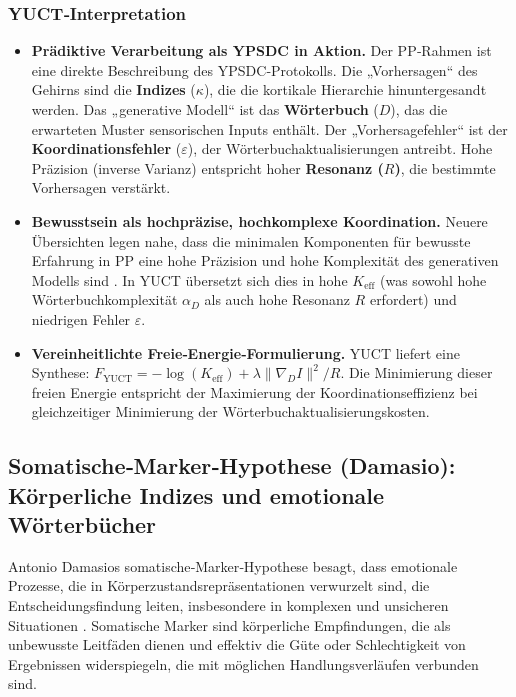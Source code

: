\documentclass[12pt,a4paper]{article}
\begin{document}
	\subsubsection*{YUCT‑Interpretation}
	\begin{itemize}
		\item \textbf{Prädiktive Verarbeitung als YPSDC in Aktion.} Der PP‑Rahmen ist eine direkte Beschreibung des YPSDC‑Protokolls. Die „Vorhersagen“ des Gehirns sind die \textbf{Indizes} (\(\kappa\)), die die kortikale Hierarchie hinuntergesandt werden. Das „generative Modell“ ist das \textbf{Wörterbuch} (\(D\)), das die erwarteten Muster sensorischen Inputs enthält. Der „Vorhersagefehler“ ist der \textbf{Koordinationsfehler} (\(\varepsilon\)), der Wörterbuchaktualisierungen antreibt. Hohe Präzision (inverse Varianz) entspricht hoher \textbf{Resonanz (\(R\))}, die bestimmte Vorhersagen verstärkt.
		\item \textbf{Bewusstsein als hochpräzise, hochkomplexe Koordination.} Neuere Übersichten legen nahe, dass die minimalen Komponenten für bewusste Erfahrung in PP eine hohe Präzision und hohe Komplexität des generativen Modells sind \cite{Wiese2017}. In YUCT übersetzt sich dies in hohe \(K_{\mathrm{eff}}\) (was sowohl hohe Wörterbuchkomplexität \(\alpha_D\) als auch hohe Resonanz \(R\) erfordert) und niedrigen Fehler \(\varepsilon\).
		\item \textbf{Vereinheitlichte Freie‑Energie‑Formulierung.} YUCT liefert eine Synthese: \(F_{\mathrm{YUCT}} = -\log(K_{\mathrm{eff}}) + \lambda \|\nabla_D I\|^2 / R\). Die Minimierung dieser freien Energie entspricht der Maximierung der Koordinationseffizienz bei gleichzeitiger Minimierung der Wörterbuchaktualisierungskosten.
	\end{itemize}
	
	\subsection{Somatische‑Marker‑Hypothese (Damasio): Körperliche Indizes und emotionale Wörterbücher}
	
	Antonio Damasios somatische‑Marker‑Hypothese besagt, dass emotionale Prozesse, die in Körperzustandsrepräsentationen verwurzelt sind, die Entscheidungsfindung leiten, insbesondere in komplexen und unsicheren Situationen \cite{Damasio1994}. Somatische Marker sind körperliche Empfindungen, die als unbewusste Leitfäden dienen und effektiv die Güte oder Schlechtigkeit von Ergebnissen widerspiegeln, die mit möglichen Handlungsverläufen verbunden sind.
	
\end{document}
